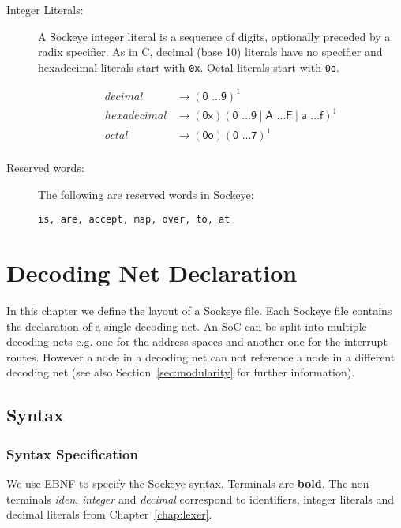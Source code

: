 \documentclass[a4paper,11pt,twoside]{report}
\begin{document}
{{{\begin{description}
\item[Integer Literals:] A Sockeye integer literal is a sequence of
  digits, optionally preceded by a radix specifier.  As in C, decimal (base 10)
  literals have no specifier and hexadecimal literals start with
  \texttt{0x}. Octal literals start with \texttt{0o}.

\begin{align*}
decimal & \rightarrow (\textsf{0 \ldots 9})^{\textrm{1}}\\
hexadecimal & \rightarrow (\textsf{0x})(\textsf{0 \ldots 9} \mid \textsf{A \ldots F} \mid \textsf{a \ldots f})^{\textrm{1}}\\
octal & \rightarrow (\textsf{0o})(\textsf{0 \ldots 7})^{\textrm{1}}\\
\end{align*}

\item[Reserved words:] The following are reserved words in Sockeye:
\begin{verbatim}
is, are, accept, map, over, to, at
\end{verbatim}

\end{description}


\chapter{Decoding Net Declaration}
\label{chap:declaration}

In this chapter we define the layout of a Sockeye file. Each Sockeye file contains the declaration of a single decoding net.
An SoC can be split into multiple decoding nets e.g. one for the address spaces and another one for the interrupt routes.
However a node in a decoding net can not reference a node in a different decoding net (see also Section~\ref{sec:modularity} for further information).

\section{Syntax}

\subsection{Syntax Specification}
We use EBNF to specify the Sockeye syntax. Terminals are \textbf{bold}.
The non-terminals \textit{iden}, \textit{integer} and \textit{decimal} correspond to identifiers, integer literals and decimal literals from Chapter~\ref{chap:lexer}.

}}}
\end{document}
